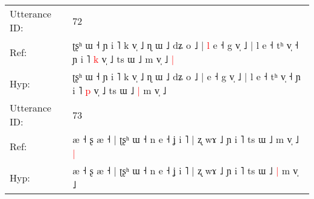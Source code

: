 \documentclass[10pt]{article}
\DeclareRobustCommand{\hl}[1]{{\textcolor{red}{#1}}}
\begin{document}
\begin{longtable}{ll}
\midrule
Utterance ID: & 72 \\
Ref: & ʈʂʰ ɯ ˧ ɲ i ˥ k v̩ ˩ ɳ ɯ ˩ dʑ o ˩ |\hl{ }\hl{l} e ˧ g v̩ ˩ | l e ˧ tʰ v̩ ˧ ɲ i ˥ \hl{k} v̩ ˩ ts ɯ ˩\hl{}\hl{} m v̩ ˩\hl{ }\hl{|}
 \\
Hyp: & ʈʂʰ ɯ ˧ ɲ i ˥ k v̩ ˩ ɳ ɯ ˩ dʑ o ˩ |\hl{}\hl{} e ˧ g v̩ ˩ | l e ˧ tʰ v̩ ˧ ɲ i ˥ \hl{p} v̩ ˩ ts ɯ ˩\hl{ }\hl{|} m v̩ ˩\hl{}\hl{}
 \\
\midrule
Utterance ID: & 73 \\
Ref: & æ ˧ ʂ æ ˧ | ʈʂʰ ɯ ˧ n e ˧ ʝ i ˥ | ʐ wɤ ˩ ɲ i ˥ ts ɯ ˩\hl{}\hl{} m v̩ ˩\hl{ }\hl{|}
 \\
Hyp: & æ ˧ ʂ æ ˧ | ʈʂʰ ɯ ˧ n e ˧ ʝ i ˥ | ʐ wɤ ˩ ɲ i ˥ ts ɯ ˩\hl{ }\hl{|} m v̩ ˩\hl{}\hl{}
 \\
\midrule
\end{longtable}
\end{document}
